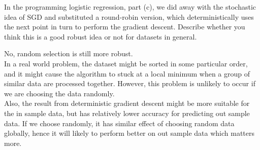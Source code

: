 \documentclass[10pt,a4paper,answers]{exam}
\begin{document}
\begin{questions}
	\question
	In the programming logistic regression, part (c), we did away with the stochastic idea of SGD and substituted a round-robin version, which deterministically uses the next point in turn to perform the gradient descent. Describe whether you think this is a good robust idea or not for datasets in general.
	\begin{solution}
		No, random selection is still more robust.\\
		In a real world problem, the dataset might be sorted in some particular order, and it might cause
		the algorithm to stuck at a local minimum when a group of similar data are processed together.
		However, this problem is unlikely to occur if we are choosing the data randomly. \\
		Also, the result from deterministic gradient descent might be more suitable for the in sample data, but
		has relatively lower accuracy for predicting out sample data. If we choose randomly, it has similar
		effect of choosing random data globally, hence it will likely to 
		perform better on out sample data which matters more.
	\end{solution}
\end{questions}
\end{document}
